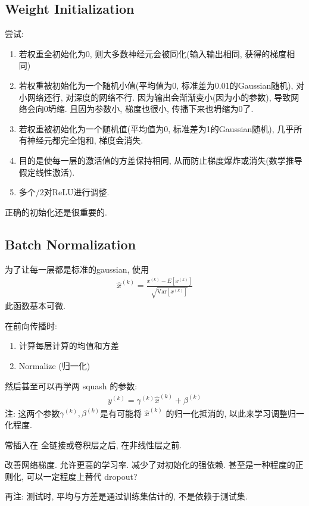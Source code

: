 \subsection{Weight Initialization}
尝试: 
\begin{enumerate}
    \item 若权重全初始化为0, 则大多数神经元会被同化(输入输出相同, 获得的梯度相同)
    \item 若权重被初始化为一个随机小值(平均值为0, 标准差为0.01的Gaussian随机), 对小网络还行, 对深度的网络不行.  因为输出会渐渐变小(因为小的参数), 导致网络会向0坍缩. 且因为参数小, 梯度也很小, 传播下来也坍缩为0了. 
    \item 若权重被初始化为一个随机值(平均值为0, 标准差为1的Gaussian随机), 几乎所有神经元都完全饱和, 梯度会消失. 
    \item 目的是使每一层的激活值的方差保持相同, 从而防止梯度爆炸或消失(数学推导假定线性激活). 
    \item 多个$/2$对ReLU进行调整. 
\end{enumerate}

正确的初始化还是很重要的. 

\subsection{Batch Normalization}
为了让每一层都是标准的gaussian, 使用
\begin{align*}
    \hat{x}^{(k)}=\frac{x^{(k)}-E\left[ x^{(k)} \right]}{\sqrt{\text{Var}\left[ x^{(k)} \right]}}
\end{align*}
此函数基本可微. 

在前向传播时:
\begin{enumerate}
    \item 计算每层计算的均值和方差
    \item Normalize (归一化)
\end{enumerate}

然后甚至可以再学两 squash 的参数:
\begin{align*}
    y^{(k)}=\gamma^{(k)}\hat{x}^{(k)}+\beta^{(k)}
\end{align*}
注: 这两个参数$\gamma^{(k)}, \beta^{(k)}$是有可能将 $\hat{x}^{(k)}$ 的归一化抵消的, 以此来学习调整归一化程度.

常插入在 全链接或卷积层之后, 在非线性层之前. 

改善网络梯度. 允许更高的学习率. 减少了对初始化的强依赖. 甚至是一种程度的正则化, 可以一定程度上替代 dropout?

再注: 测试时, 平均与方差是通过训练集估计的, 不是依赖于测试集. 


